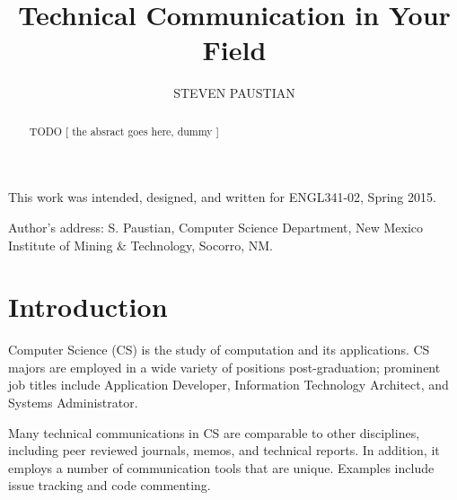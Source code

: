 \documentclass[prodmode,acmtecs]{acmsmall} %
\begin{document}

\title{Technical Communication in Your Field}
\author{STEVEN PAUSTIAN
}

\begin{abstract}
TODO [ the absract goes here, dummy ]
\end{abstract}





\begin{bottomstuff}
This work was intended, designed, and written for ENGL341-02, Spring 2015.

Author's address: S. Paustian, Computer Science Department,
New Mexico Institute of Mining \& Technology, Socorro, NM.
\end{bottomstuff}

\maketitle


\section{Introduction}
Computer Science (CS) is the study of computation and its applications.  CS majors are employed in a wide variety of positions post-graduation; prominent job titles include Application Developer, Information Technology Architect, and Systems Administrator.\cite{payscale}

Many technical communications in CS are comparable to other disciplines, including peer reviewed journals, memos, and technical reports.  In addition, it employs a number of communication tools that are unique.  Examples include issue tracking and code commenting. 
\end{document}
